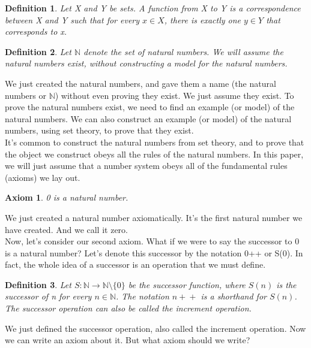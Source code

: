 \documentclass{article}
\newtheorem{axiom}{Axiom}
\newtheorem{definition}{Definition}
\newcommand{\inc}[1]{#1\!+\!+}
\begin{document}
\begin{definition}
Let X and Y be sets. A function from X to Y is a correspondence between X and Y such that for every $x \in X$, there is exactly one $y \in Y$ that corresponds to x. 
\end{definition}

\begin{definition}
Let $\mathbb{N}$ denote the set of natural numbers. We will assume the natural numbers exist, without constructing a model for the natural numbers.
\end{definition}

We just created the natural numbers, and gave them a name (the natural numbers or $\mathbb{N}$) without even proving they exist. We just assume they exist. To prove the natural numbers exist, we need to find an example (or model) of the natural numbers. We can also construct an example (or model) of the natural numbers, using set theory, to prove that they exist. \\

It's common to construct the natural numbers from set theory, and to prove that the object we construct obeys all the rules of the natural numbers. In this paper, we will just assume that a number system obeys all of the fundamental rules (axioms) we lay out.

\begin{axiom}
0 is a natural number.
\end{axiom}

We just created a natural number axiomatically. It's the first natural number we have created. And we call it zero. \\

Now, let's consider our second axiom. What if we were to say the successor to 0 is a natural number? Let's denote this successor by the notation 0++ or S(0). In fact, the whole idea of a successor is an operation that we must define.

\begin{definition}
Let $S : \mathbb{N} \to \mathbb{N}\setminus\{0\}$ be the successor function, where $S(n)$ is the successor of n for every $n \in \mathbb{N}$. The notation $\inc{n}$ is a shorthand for $S(n)$. The successor operation can also be called the increment operation.
\end{definition}

We just defined the successor operation, also called the increment operation. Now we can write an axiom about it. But what axiom should we write? \\
\end{document}
